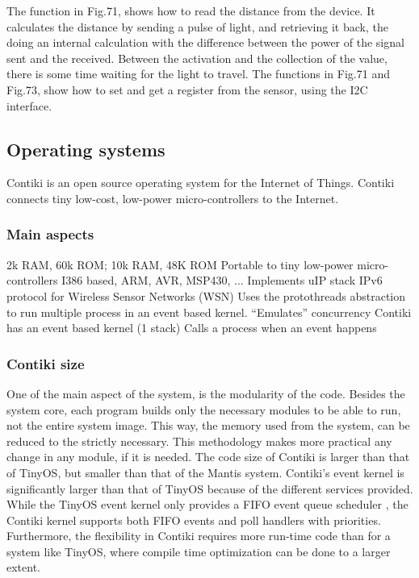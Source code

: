 The function in Fig.71,
	shows how to read the distance from the device.
It calculates the distance by sending a pulse of light,
	and retrieving it back,
	the doing an internal calculation with the difference between the power of the signal sent and the received.
Between the activation and the collection of the value,
	there is some time waiting for the light to travel.
The functions in Fig.71 and Fig.73,
	show how to set and get a register from the sensor,
	using the I2C interface.




\subsection{Operating systems}

Contiki is an open source operating system for the Internet of Things.
Contiki connects tiny low-cost,
	low-power micro-controllers to the Internet.

\subsubsection{Main aspects}
2k RAM, 60k ROM; 10k RAM, 48K ROM
Portable to tiny low-power micro-controllers
I386 based, ARM, AVR, MSP430, ...
Implements uIP stack
IPv6 protocol for Wireless Sensor Networks (WSN)
Uses the protothreads abstraction to run multiple process in an event based
kernel.
“Emulates” concurrency
Contiki has an event based kernel (1 stack)
Calls a process when an event happens

\subsubsection{Contiki size}
One of the main aspect of the system,
	is the modularity of the code.
Besides the system core,
	each program builds only the necessary modules to be able to run,
	not the entire system image.
This way,
	the memory used from the system,
	can be reduced to the strictly necessary.
This methodology makes more practical any change in any module,
	if it is needed.
The code size of Contiki is larger than that of TinyOS,
	but smaller than that of the Mantis system.
Contiki's event kernel is significantly larger than that of TinyOS because of the different services provided.
While the TinyOS event kernel only provides a FIFO event queue scheduler ,
	the Contiki kernel supports both FIFO events and poll handlers with priorities.
Furthermore,
	the flexibility in Contiki requires more run-time code than for a system like TinyOS,
	where compile time optimization can be done to a larger extent.

